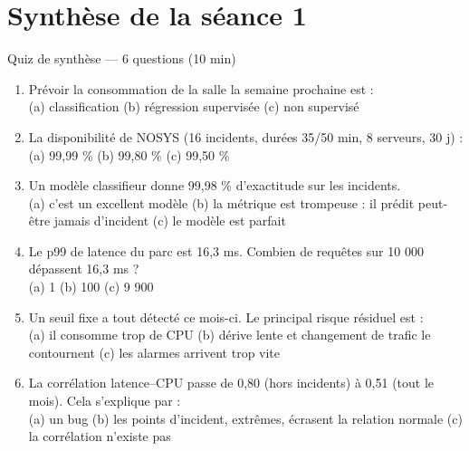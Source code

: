 \section{Synthèse de la séance 1}

\begin{frame}{Quiz de synthèse --- 6 questions (10 min)}
\begin{qbox}
\begin{enumerate}
\item Prévoir la consommation de la salle la semaine prochaine est :\\
(a) classification \quad (b) régression supervisée \quad (c) non supervisé
\item La disponibilité de NOSYS (16 incidents, durées 35/50 min, 8 serveurs, 30 j) :\\
(a) 99,99 \% \quad (b) 99,80 \% \quad (c) 99,50 \%
\item Un modèle classifieur donne 99,98 \% d'exactitude sur les incidents.\\
(a) c'est un excellent modèle \quad (b) la métrique est trompeuse : il
prédit peut-être jamais d'incident \quad (c) le modèle est parfait
\item Le p99 de latence du parc est 16,3 ms. Combien de requêtes sur
10 000 dépassent 16,3 ms ?\\
(a) 1 \quad (b) 100 \quad (c) 9 900
\item Un seuil fixe a tout détecté ce mois-ci. Le principal risque résiduel est :\\
(a) il consomme trop de CPU \quad (b) dérive lente et changement de trafic
le contournent \quad (c) les alarmes arrivent trop vite
\item La corrélation latence--CPU passe de 0,80 (hors incidents) à 0,51 (tout le mois).
Cela s'explique par :\\
(a) un bug \quad (b) les points d'incident, extrêmes, écrasent la relation normale
\quad (c) la corrélation n'existe pas
\end{enumerate}
\end{qbox}
\end{frame}

